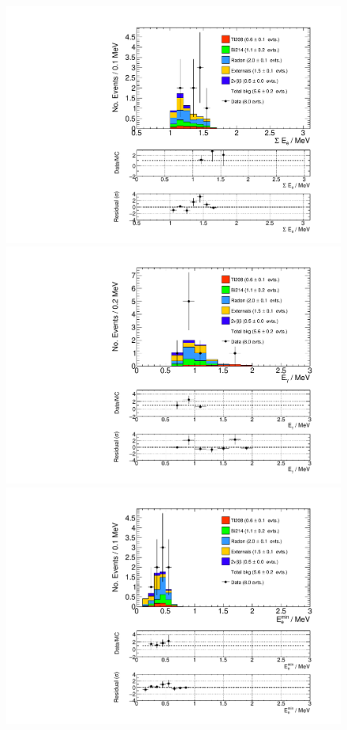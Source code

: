 \documentclass[main.tex]{subfiles}
\begin{document}
\begin{figure} [h!]
\begin{center}
\includegraphics[scale=0.36]{pictures/FinalResults/bb0nu2/150/SEe_bb0nu2NS.pdf}
\includegraphics[scale=0.36]{pictures/FinalResults/bb0nu2/150/Eg_bb0nu2NS.pdf}
\includegraphics[scale=0.35]{pictures/FinalResults/bb0nu2/150/Eemin_bb0nu2NS.pdf}

\end{center}
\end{figure}
\end{document}
